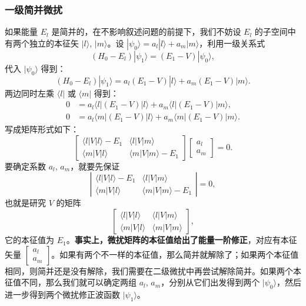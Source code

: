 \subsubsection{一级简并微扰}
如果能量 $E_l$ 是简并的，在不影响叙述问题的前提下，我们不妨设 $E_l$ 的子空间中有两个独立的本征矢 $|l\rangle$, $|m\rangle$。设 $\boxed{|\psi_0\rangle = a_l |l\rangle + a_m |m\rangle}$，利用一级关系式
\begin{equation}
	(H_0 - E_l)|\psi_1\rangle = (E_1 - V)|\psi_0\rangle,
\end{equation}
代入 $|\psi_0\rangle$ 得到：
\begin{equation}
	(H_0 - E_l)|\psi_1\rangle = a_l (E_1 - V)|l\rangle + a_m (E_1 - V)|m\rangle.
\end{equation}
两边同时左乘 $\langle l|$ 或 $\langle m|$ 得到：
\begin{align}
	0 &= a_l\langle l|(E_1 - V)|l\rangle + a_m\langle l|(E_1 - V)|m\rangle, \\
	0 &= a_l\langle m|(E_1 - V)|l\rangle + a_m\langle m|(E_1 - V)|m\rangle.
\end{align}
写成矩阵形式如下：
\begin{equation}
	\begin{bmatrix}
		\langle l|V|l\rangle - E_1 & \langle l|V|m\rangle \\
		\langle m|V|l\rangle & \langle m|V|m\rangle - E_1
	\end{bmatrix}
	\begin{bmatrix}
		a_l \\ a_m
	\end{bmatrix} = 0.
\end{equation}
要确定系数 $a_l$, $a_m$，就要先保证
\begin{equation}
	\left|\begin{array}{cc}
		\langle l|V|l\rangle - E_1 & \langle l|V|m\rangle \\
		\langle m|V|l\rangle & \langle m|V|m\rangle - E_1
	\end{array}\right| = 0,
\end{equation}
也就是研究 $V$ 的矩阵
\begin{equation}
	\begin{bmatrix}
		\langle l|V|l\rangle & \langle l|V|m\rangle \\
		\langle m|V|l\rangle & \langle m|V|m\rangle
	\end{bmatrix},
\end{equation}
它的本征值为 $E_1$。\textbf{事实上，微扰矩阵的本征值给出了能量一阶修正}，对应有本征矢量 $\begin{bmatrix} a_l \\ a_m \end{bmatrix}$。如果有两个不一样的本征值，那么简并就解除了；如果两个本征值相同，则简并还是没有解除，我们需要在二级微扰中再尝试解除简并。如果两个本征值不同，那么我们就可以确定两组 $a_l$, $a_m$，分别从它们出发得到两个 $|\psi_0\rangle$，然后进一步得到两个微扰修正波函数 $|\psi_1\rangle$。


